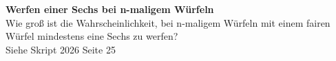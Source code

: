 \begin{bsp}
    \textbf{Werfen einer Sechs bei n-maligem Würfeln}   \\
    Wie groß ist die Wahrscheinlichkeit, bei n-maligem Würfeln mit einem fairen Würfel mindestens eine
    Sechs zu werfen? \\
    Siehe Skript 2026 Seite 25
\end{bsp}



\newpage

